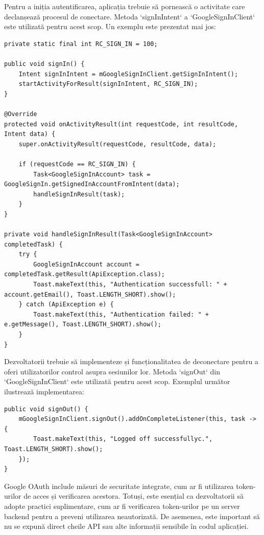 \documentclass[runningheads]{llncs}
\begin{document}

Pentru a iniția autentificarea, aplicația trebuie să pornească o activitate care declanșează procesul de conectare. Metoda `signInIntent` a `GoogleSignInClient` este utilizată pentru acest scop. Un exemplu este prezentat mai jos:

\begin{lstlisting}
private static final int RC_SIGN_IN = 100;

public void signIn() {
    Intent signInIntent = mGoogleSignInClient.getSignInIntent();
    startActivityForResult(signInIntent, RC_SIGN_IN);
}

@Override
protected void onActivityResult(int requestCode, int resultCode, Intent data) {
    super.onActivityResult(requestCode, resultCode, data);

    if (requestCode == RC_SIGN_IN) {
        Task<GoogleSignInAccount> task = GoogleSignIn.getSignedInAccountFromIntent(data);
        handleSignInResult(task);
    }
}

private void handleSignInResult(Task<GoogleSignInAccount> completedTask) {
    try {
        GoogleSignInAccount account = completedTask.getResult(ApiException.class);
        Toast.makeText(this, "Authentication successfull: " + account.getEmail(), Toast.LENGTH_SHORT).show();
    } catch (ApiException e) {
        Toast.makeText(this, "Authentication failed: " + e.getMessage(), Toast.LENGTH_SHORT).show();
    }
}
\end{lstlisting}


Dezvoltatorii trebuie să implementeze și funcționalitatea de deconectare pentru a oferi utilizatorilor control asupra sesiunilor lor. Metoda `signOut` din `GoogleSignInClient` este utilizată pentru acest scop. Exemplul următor ilustrează implementarea:

\begin{lstlisting}
public void signOut() {
    mGoogleSignInClient.signOut().addOnCompleteListener(this, task -> {
        Toast.makeText(this, "Logged off successfullyc.", Toast.LENGTH_SHORT).show();
    });
}
\end{lstlisting}


Google OAuth include măsuri de securitate integrate, cum ar fi utilizarea token-urilor de acces și verificarea acestora. Totuși, este esențial ca dezvoltatorii să adopte practici suplimentare, cum ar fi verificarea token-urilor pe un server backend pentru a preveni utilizarea neautorizată. De asemenea, este important să nu se expună direct cheile API sau alte informații sensibile în codul aplicației.
\end{document}
